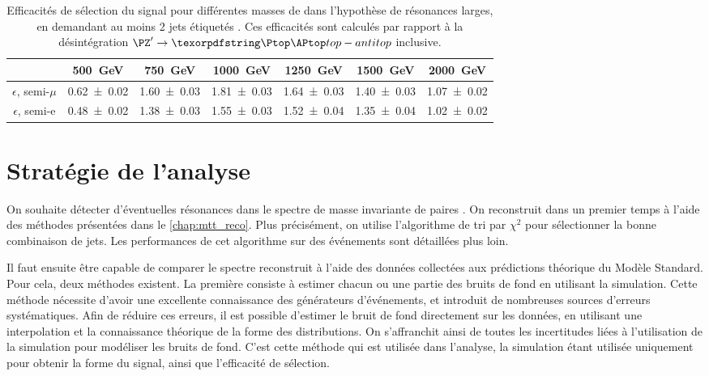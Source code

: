 \begin{table}[p!] \centering
  \begin{tabular}{ccccccc} \toprule
    & \SI{500}{\GeV} & \SI{750}{\GeV} & \SI{1000}{\GeV} & \SI{1250}{\GeV} & \SI{1500}{\GeV} & \SI{2000}{\GeV} \\ \midrule
    $\epsilon$, semi-$\mu$ & \num{0.62 \pm 0.02} & \num{1.60 \pm 0.03} & \num{1.81 \pm 0.03} & \num{1.64 \pm 0.03} & \num{1.40 \pm 0.03} & \num{1.07 \pm 0.02} \\
    $\epsilon$, semi-e & \num{0.48 \pm 0.02} & \num{1.38 \pm 0.03} & \num{1.55 \pm 0.03} & \num{1.52 \pm 0.04} & \num{1.35 \pm 0.04} & \num{1.02 \pm 0.02} \\ \bottomrule
  \end{tabular}
  \caption{Efficacités de sélection du signal pour différentes masses de \zprime dans l'hypothèse de résonances larges, en demandant au moins 2 jets étiquetés \Pbottom. Ces efficacités sont calculés par rapport à la désintégration $\zprime \rightarrow \ttbar$ inclusive.}
  \label{tab:eff_large_2b}
\end{table}

\section{Stratégie de l'analyse}

On souhaite détecter d'éventuelles résonances dans le spectre de masse invariante de paires \ttbar. On reconstruit dans un premier temps \mtt à l'aide des méthodes présentées dans le \cref{chap:mtt_reco}. Plus précisément, on utilise l'algorithme de tri par $\chi^2$ pour sélectionner la bonne combinaison de jets. Les performances de cet algorithme sur des événements \zprime sont détaillées plus loin.

\smallskip

Il faut ensuite être capable de comparer le spectre \mtt reconstruit à l'aide des données collectées aux prédictions théorique du Modèle Standard. Pour cela, deux méthodes existent. La première consiste à estimer chacun ou une partie des bruits de fond en utilisant la simulation. Cette méthode nécessite d'avoir une excellente connaissance des générateurs d'événements, et introduit de nombreuses sources d'erreurs systématiques. Afin de réduire ces erreurs, il est possible d'estimer le bruit de fond directement sur les données, en utilisant une interpolation et la connaissance théorique de la forme des distributions. On s'affranchit ainsi de toutes les incertitudes liées à l'utilisation de la simulation pour modéliser les bruits de fond. C'est cette méthode qui est utilisée dans l'analyse, la simulation étant utilisée uniquement pour obtenir la forme du signal, ainsi que l'efficacité de sélection.

